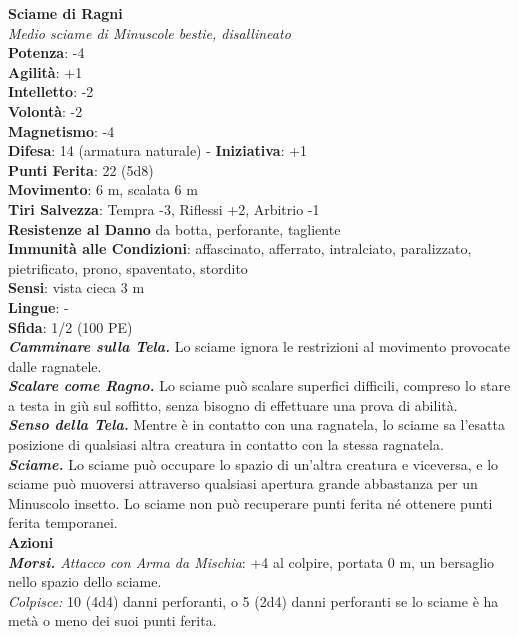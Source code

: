 \begin{multicols}{2}
\medskip\textbf{Sciame di Ragni}\\
\emph{Medio sciame di Minuscole bestie, disallineato}\\
\textbf{Potenza}: -4\\
\textbf{Agilità}: +1\\
\textbf{Intelletto}: -2\\
\textbf{Volontà}: -2\\
\textbf{Magnetismo}: -4\\
\textbf{Difesa}: 14 (armatura naturale) - \textbf{Iniziativa}: +1\\
\textbf{Punti Ferita}: 22 (5d8)\\
\textbf{Movimento}: 6 m, scalata 6 m\\
\textbf{Tiri Salvezza}: Tempra -3, Riflessi +2, Arbitrio -1\\
\textbf{Resistenze al Danno} da botta, perforante, tagliente\\
\textbf{Immunità alle Condizioni}: affascinato, afferrato, intralciato, paralizzato, pietrificato, prono, spaventato, stordito\\
\textbf{Sensi}: vista cieca 3 m\\
\textbf{Lingue}: -\\
\textbf{Sfida}: 1/2 (100 PE)\smallskip\\
\emph{\textbf{Camminare sulla Tela.}} Lo sciame ignora le restrizioni al movimento provocate dalle ragnatele.\\
\emph{\textbf{Scalare come Ragno.}} Lo sciame può scalare superfici difficili, compreso lo stare a testa in giù sul soffitto, senza bisogno di effettuare una prova di abilità.\\
\emph{\textbf{Senso della Tela.}} Mentre è in contatto con una ragnatela, lo sciame sa l'esatta posizione di qualsiasi altra creatura in contatto con la stessa ragnatela.\\
\emph{\textbf{Sciame.}} Lo sciame può occupare lo spazio di un'altra creatura e viceversa, e lo sciame può muoversi attraverso qualsiasi apertura grande abbastanza per un Minuscolo insetto. Lo sciame non può recuperare punti ferita né ottenere punti ferita temporanei.\\
\smallskip\textbf{Azioni}\\
\emph{\textbf{Morsi.} Attacco con Arma da Mischia}: +4 al colpire, portata 0 m, un bersaglio nello spazio dello sciame.\\
\emph{Colpisce:} 10 (4d4) danni perforanti, o 5 (2d4) danni perforanti se lo sciame è ha metà o meno dei suoi punti ferita.\\


\end{multicols}
